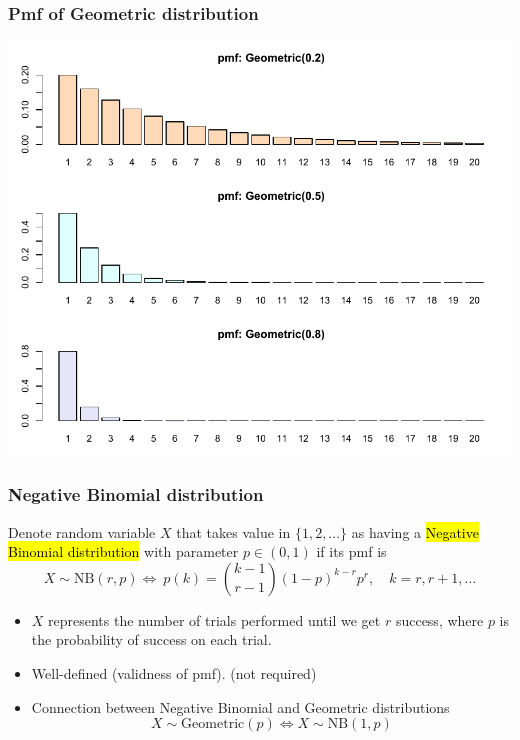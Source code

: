 \documentclass[slidestop,compress,mathserif]{beamer}
\begin{document}
\begin{frame}\frametitle{Pmf of Geometric distribution}

\vspace{-0.5cm}
\begin{center}
\includegraphics[scale = 0.63]{figures/pmf4}
\end{center}

\end{frame}


\begin{frame}\frametitle{Negative Binomial distribution}
\begin{defn}
Denote random variable $X$ that takes value in $\{1, 2, \ldots\}$ as having a \hl{Negative Binomial distribution}
 with parameter $p \in (0, 1)$ if its pmf is
\[ X \sim \text{NB}(r, p) \Longleftrightarrow\ p(k) = {k - 1 \choose r - 1}(1-p)^{k-r}p^{r},\quad k = r, r+1, \ldots \]
\end{defn}

\begin{itemize}
\item $X$ represents the number of trials performed until we get $r$ success, where $p$ is the probability of success on each trial.

\pause
\item Well-defined (validness of pmf). ({\color{red}not required})


\pause
\item Connection between Negative Binomial and Geometric distributions
\[ X \sim \text{Geometric}(p) \Longleftrightarrow  X \sim \text{NB}(1, p) \]


\end{itemize}


\end{frame}
\end{document}
